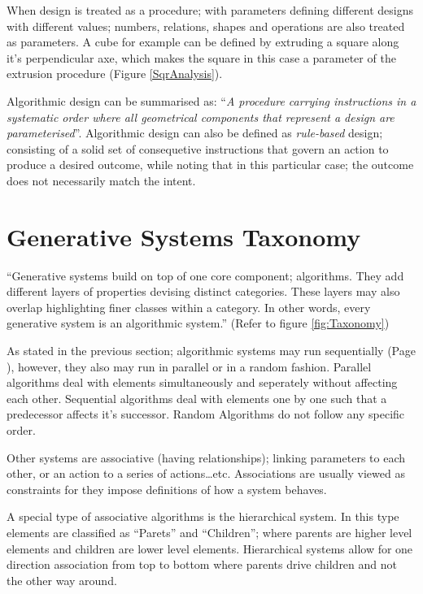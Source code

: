 When design is treated as a procedure; with parameters defining different designs with different values; numbers, relations, shapes and operations are also treated as parameters. A cube for example can be defined by extruding a square along it's perpendicular axe, which makes the square in this case a parameter of the extrusion procedure (Figure \ref{SqrAnalysis}).

Algorithmic design can be summarised as: ``\emph{A procedure carrying instructions in a systematic order where all geometrical components that represent a design are parameterised}''\cite{hernandez06}. Algorithmic design can also be defined as \emph{rule-based} design; consisting of a solid set of consequetive instructions that govern an action to produce a desired outcome, while noting that in this particular case; the outcome does not necessarily match the intent.

\clearpage
\section{Generative Systems Taxonomy}

\label{GenSysTax}
``Generative systems build on top of one core component; algorithms. They add different layers of properties devising distinct categories. These layers may also overlap highlighting finer classes within a category. In other words, every generative system is an algorithmic system.'' \cite{khaldi04} (Refer to figure \ref{fig:Taxonomy})

As stated in the previous section; algorithmic systems may run sequentially (Page \pageref{SequentialAlgorithms}), however, they also may run in parallel or in a random fashion. Parallel algorithms deal with elements simultaneously and seperately without affecting each other. Sequential algorithms deal with elements one by one such that a predecessor affects it's successor. Random Algorithms do not follow any specific order. \cite{khaldi04}

Other systems are associative (having relationships); linking parameters to each other, or an action to a series of actions\ldots etc. Associations are usually viewed as constraints for they impose definitions of how a system behaves. \cite{khaldi04}

A special type of associative algorithms is the hierarchical system. In this type elements are classified as ``Parets'' and ``Children''; where parents are higher level elements and children are lower level elements. Hierarchical systems allow for one direction association from top to bottom where parents drive children and not the other way around. \cite{khaldi04}

